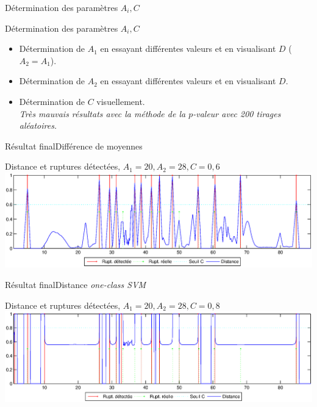 \begin{frame}{Détermination des paramètres $A_i, C$}

\begin{block}{Détermination des paramètres $A_i, C$}
\begin{itemize}
\item Détermination de $A_1$ en essayant différentes valeurs et en visualisant $D$ ($A_2=A_1$).
\item Détermination de $A_2$ en essayant différentes valeurs et en visualisant $D$.
\item Détermination de $C$ visuellement.\\
\textit{Très mauvais résultats avec la méthode de la $p$-valeur avec 200 tirages aléatoires.}
\end{itemize}
\end{block}

\end{frame}

\begin{frame}{Résultat final}{Différence de moyennes}

{
\begin{exampleblock}{Distance et ruptures détectées, $A_1 = 20, A_2 = 28, C = 0,6$}
\centering
\includegraphics[width=\textwidth]{images/resultatMoy}
\end{exampleblock}
}

\end{frame}

\begin{frame}{Résultat final}{Distance \textit{one-class SVM}}

{
\begin{exampleblock}{Distance et ruptures détectées, $A_1 = 20, A_2 = 28, C = 0,8$}
\centering
\includegraphics[width=\textwidth]{images/resultatSVM}
\end{exampleblock}
}

\end{frame}
